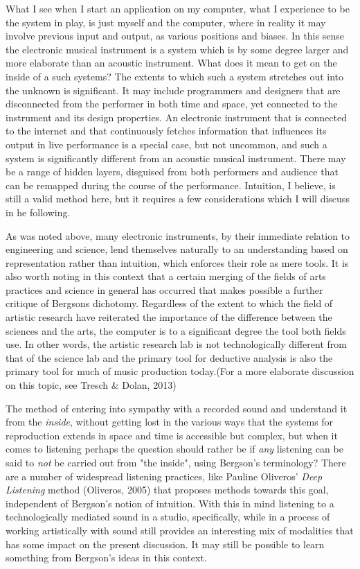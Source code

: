 \documentclass[11pt]{article}
\makeatletter
\newcommand{\citeprocitem}[2]{\hyper@linkstart{cite}{citeproc_bib_item_#1}#2\hyper@linkend}
\makeatother
\begin{document}
What I see when I start an application on my computer, what I experience to be the system in play, is just myself and the computer, where in reality it may involve previous input and output, as various positions and biases.
In this sense the electronic musical instrument is a system which is by some degree larger and more elaborate than an acoustic instrument.
What does it mean to get on the inside of a such systems?
The extents to which such a system stretches out into the unknown is significant.
It may include programmers and designers that are disconnected from the performer in both time and space, yet connected to the instrument and its design properties.
An electronic instrument that is connected to the internet and that continuously fetches information that influences its output in live performance is a special case, but not uncommon, and such a system is significantly different from an acoustic musical instrument.
There may be a range of hidden layers, disguised from both performers and audience that can be remapped during the course of the performance.
Intuition, I believe, is still a valid method here, but it requires a few considerations which I will discuss in he following.

As was noted above, many electronic instruments, by their immediate relation to engineering and science, lend themselves naturally to an understanding based on representation rather than intuition, which enforces their role as mere tools.
It is also worth noting in this context that a certain merging of the fields of arts practices and science in general has occurred that makes possible a further critique of Bergsons dichotomy.
Regardless of the extent to which the field of artistic research have reiterated the importance of the difference between the sciences and the arts, the computer is to a significant degree the tool both fields use.
In other words, the artistic research lab is not technologically different from that of the science lab and the primary tool for deductive analysis is also the primary tool for much of music production today.(For a more elaborate discussion on this topic, see \citeprocitem{22}{Tresch \& Dolan, 2013})

The method of entering into sympathy with a recorded sound and understand it from the \emph{inside}, without getting lost in the various ways that the systems for reproduction extends in space and time is accessible but complex, but when it comes to listening perhaps the question should rather be if \emph{any} listening can be said to \emph{not} be carried out from "the inside", using Bergson's terminology?
There are a number of widespread listening practices, like Pauline Oliveros' \emph{Deep Listening} method (\citeprocitem{19}{Oliveros, 2005}) that proposes methods towards this goal, independent of Bergson's notion of intuition.
With this in mind listening to a technologically mediated sound in a studio, specifically, while in a process of working artistically with sound still provides an interesting mix of modalities that has some impact on the present discussion. It may still be possible to learn something from Bergson's ideas in this context.  
\end{document}

